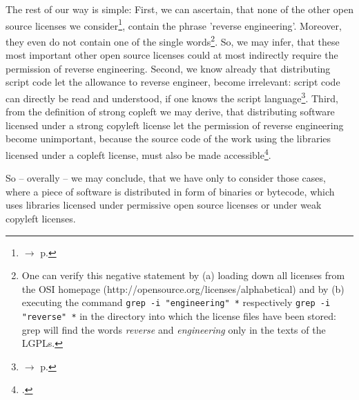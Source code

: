 %
%
%
%
%

The rest of our way is simple: First, we can ascertain, that none of the other
open source licenses we consider\footnote{$\rightarrow$ p.
\pageref{RevEngOslicOsLisences} }, contain the phrase 'reverse engineering'.
Moreover, they even do not contain one of the single words\footnote{One can
verify this negative statement by (a) loading down all licenses from the OSI
homepage (http://opensource.org/licenses/alphabetical) and by (b) executing the
command \texttt{grep -i "engineering" *} respectively \texttt{grep -i "reverse"
*} in the directory into which the license files have been stored: grep will
find the words \emph{reverse} and \emph{engineering} only in the texts of the
LGPLs.}. So, we may infer, that these most important other open source licenses
could at most indirectly require the permission of reverse engineering. Second,
we know already that distributing script code let the allowance to reverse
engineer, become irrelevant: script code can directly be read and understood, if
one knows the script language\footnote{$\rightarrow$ p.
\pageref{RevEngDistributeScripts}}.
Third, from the definition of strong copleft we may derive, that distributing
software licensed under a strong copyleft license let the permission of reverse
engineering become unimportant, because the source code of the work using the
libraries licensed under a copleft license, must also be made
accessible\footcite[cf.][\nopage wp]{Stallman1996c}.

So -- overally -- we may conclude, that we have only to consider those cases,
where a piece of software is distributed in form of binaries or bytecode, which
uses libraries licensed under permissive open source licenses or under weak
copyleft licenses.

